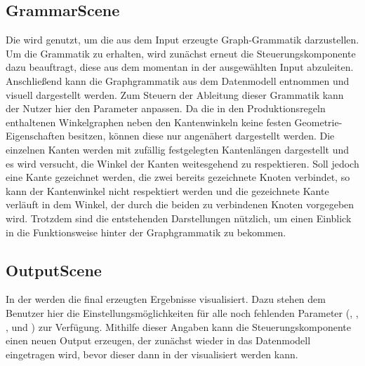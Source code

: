 \subsection{GrammarScene}
Die  wird genutzt, um die aus dem Input erzeugte Graph-Grammatik darzustellen. Um die Grammatik zu erhalten, wird
zunächst erneut die Steuerungskomponente dazu beauftragt, diese aus dem momentan in der  ausgewählten Input abzuleiten.
Anschließend kann die Graphgrammatik aus dem Datenmodell entnommen und visuell dargestellt werden. Zum Steuern der Ableitung dieser
Grammatik kann der Nutzer hier den Parameter  anpassen. Da die in den
Produktionsregeln enthaltenen Winkelgraphen neben den Kantenwinkeln keine festen Geometrie-Eigenschaften besitzen, können diese nur
angenähert dargestellt werden. Die einzelnen Kanten werden mit zufällig festgelegten Kantenlängen dargestellt und es wird versucht, die
Winkel der Kanten weitesgehend zu respektieren. Soll jedoch eine Kante gezeichnet werden, die zwei bereits gezeichnete Knoten verbindet,
so kann der Kantenwinkel nicht respektiert werden und die gezeichnete Kante verläuft in dem Winkel, der durch die beiden zu verbindenen
Knoten vorgegeben wird. Trotzdem sind die entstehenden Darstellungen nützlich, um einen Einblick in die Funktionsweise hinter der
Graphgrammatik zu bekommen.

\subsection{OutputScene}
In der  werden die final erzeugten Ergebnisse visualisiert. Dazu stehen dem Benutzer hier die Einstellungsmöglichkeiten
für alle noch fehlenden Parameter (, , ,  und ) zur
Verfügung. Mithilfe dieser Angaben kann die Steuerungskomponente einen neuen Output erzeugen, der zunächst wieder in das Datenmodell
eingetragen wird, bevor dieser dann in der  visualisiert werden kann.
